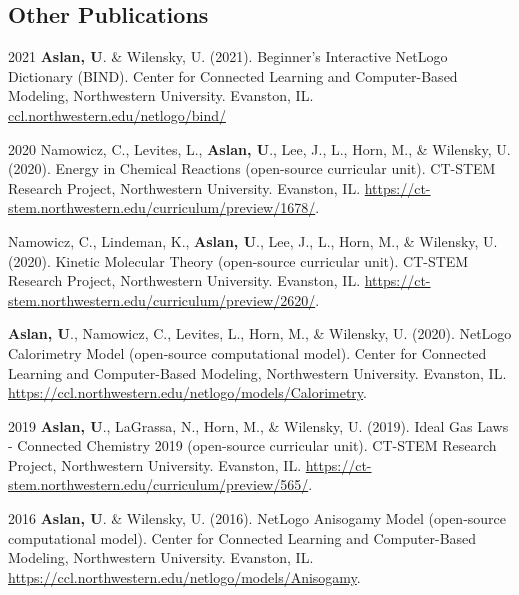 \documentclass[11pt,letterpaper]{report} %
\begin{document}

    \subsection*{Other Publications}

    \begin{tablist}

        \item[2021] \tab{}\textbf{Aslan, U}. \& Wilensky, U. (2021). Beginner’s Interactive NetLogo Dictionary (BIND). Center for Connected Learning and Computer-Based Modeling, Northwestern University. Evanston, IL. \href{https://ccl.northwestern.edu/netlogo/bind/}{ccl.northwestern.edu/netlogo/bind/}

        \item[2020]     \tab{}Namowicz, C., Levites, L., \textbf{Aslan, U}., Lee, J., L., Horn, M., \& Wilensky, U. (2020). Energy in Chemical Reactions (open-source curricular unit). CT-STEM Research Project, Northwestern University. Evanston, IL. \href{https://ct-stem.northwestern.edu/curriculum/preview/1678/}{https://ct-stem.northwestern.edu/curriculum/preview/1678/}.

        \item[]     \tab{}Namowicz, C., Lindeman, K., \textbf{Aslan, U}., Lee, J., L., Horn, M., \& Wilensky, U. (2020). Kinetic Molecular Theory (open-source curricular unit). CT-STEM Research Project, Northwestern University. Evanston, IL. \href{https://ct-stem.northwestern.edu/curriculum/preview/2620/}{https://ct-stem.northwestern.edu/curriculum/preview/2620/}.

        \item[]     \tab{}\textbf{Aslan, U}., Namowicz, C., Levites, L., Horn, M., \& Wilensky, U. (2020). NetLogo Calorimetry Model (open-source computational model). Center for Connected Learning and Computer-Based Modeling, Northwestern University. Evanston, IL. \href{https://ccl.northwestern.edu/netlogo/models/Calorimetry}{https://ccl.northwestern.edu/netlogo/models/Calorimetry}.

        \item[2019] \tab{}\textbf{Aslan, U}., LaGrassa, N., Horn, M., \& Wilensky, U. (2019). Ideal Gas Laws - Connected Chemistry 2019 (open-source curricular unit). CT-STEM Research Project, Northwestern University. Evanston, IL. \href{https://ct-stem.northwestern.edu/curriculum/preview/565/}{https://ct-stem.northwestern.edu/curriculum/preview/565/}.

         \item[2016]     \tab{}\textbf{Aslan, U}. \& Wilensky, U. (2016). NetLogo Anisogamy Model (open-source computational model). Center for Connected Learning and Computer-Based Modeling, Northwestern University. Evanston, IL. \href{https://ccl.northwestern.edu/netlogo/models/Anisogamy}{https://ccl.northwestern.edu/netlogo/models/Anisogamy}.

    \end{tablist}
\end{document}
